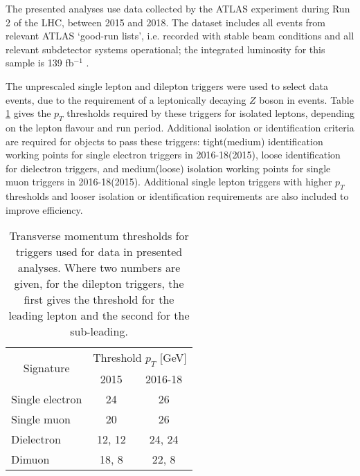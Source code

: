 
The presented analyses use data collected by the \ac{ATLAS} experiment during
Run 2 of the \ac{LHC}, between 2015 and 2018. The dataset includes all events
from relevant ATLAS `good-run lists', i.e. recorded with stable beam
conditions and all relevant subdetector systems operational;
the integrated luminosity for this sample is 139 fb$^{-1}$ \cite{ATLASdq2020}.

The unprescaled single lepton and dilepton triggers
\cite{ATLAStrigegam2020,ATLAStrigmuon2020}
were used to select data events, due to the requirement of a leptonically
decaying $Z$ boson in events. Table \ref{tab:methods-data-triggers} gives the
$p_T$ thresholds required by these triggers for isolated leptons, depending on
the lepton flavour and run period. Additional isolation or identification
criteria are required for objects to pass these triggers: tight(medium)
identification working points for single electron triggers in 2016-18(2015), loose
identification for dielectron triggers, and medium(loose) isolation working
points for single muon triggers in 2016-18(2015).
Additional single lepton triggers with higher
$p_T$ thresholds and looser isolation or identification requirements are also included to improve
efficiency.

\begin{table}[!b]
  \centering
  \renewcommand\arraystretch{1.2}
  \caption{
    Transverse momentum thresholds for triggers used for data in presented analyses.
    Where two numbers are given, for the dilepton triggers, the first gives the
    threshold for the leading lepton and the second for the sub-leading.
  }
  \label{tab:methods-data-triggers}
  \begin{tabular}{lcc}
    \hline\hline
    \multicolumn{1}{c}{\multirow{2}{*}{Signature}} & \multicolumn{2}{c}{Threshold $p_T$ [GeV]} \\
    \cline{2-3}
              & 2015    &   2016-18 \\
    \hline
    Single electron  &  24     &  26     \\   
    Single muon      &  20     &  26     \\   
    Dielectron       &  12, 12  &  24, 24  \\
    Dimuon           &  18, 8   &  22, 8   \\
    \hline\hline
  \end{tabular}
\end{table}

